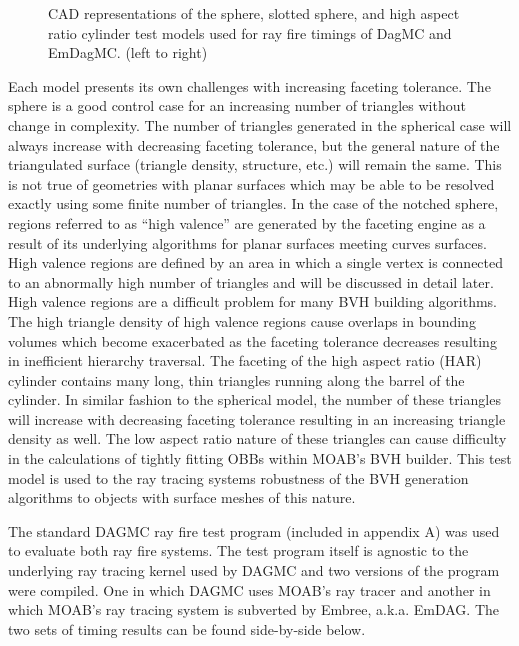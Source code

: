 \documentclass[10pt, a4paper]{article}
\begin{document}
\begin{figure}
\begin{center}
    \caption{CAD representations of the sphere, slotted sphere, and high aspect ratio cylinder test models used for ray fire timings of DagMC and EmDagMC. (left to right) \label{models}}

  \end{center}
\vspace{-0.3cm}

\end{figure} 


Each model presents its own challenges with increasing faceting tolerance. The sphere is a good control case for an increasing number of triangles without change in complexity. The number of triangles generated in the spherical case will always increase with decreasing faceting tolerance, but the general nature of the triangulated surface (triangle density, structure, etc.) will remain the same. This is not true of geometries with planar surfaces which may be able to be resolved exactly using some finite number of triangles. In the case of the notched sphere, regions referred to as ``high valence'' are generated by the faceting engine as a result of its underlying algorithms for planar surfaces meeting curves surfaces. High valence regions are defined by an area in which a single vertex is connected to an abnormally high number of triangles and will be discussed in detail later. High valence regions are a difficult problem for many BVH building algorithms. The high triangle density of high valence regions cause overlaps in bounding volumes which become exacerbated as the faceting tolerance decreases resulting in inefficient hierarchy traversal. The faceting of the high aspect ratio (HAR) cylinder contains many long, thin triangles running along the barrel of the cylinder. In similar fashion to the spherical model, the number of these triangles will increase with decreasing faceting tolerance resulting in an increasing triangle density as well. The low aspect ratio nature of these triangles can cause difficulty in the calculations of tightly fitting OBBs within MOAB's BVH builder. This test model is used to the ray tracing systems robustness of the BVH generation algorithms to objects with surface meshes of this nature.

The standard DAGMC ray fire test program (included in appendix A) was used to evaluate both ray fire systems. The test program itself is agnostic to the underlying ray tracing kernel used by DAGMC and two versions of the program were compiled. One in which DAGMC uses MOAB's ray tracer and another in which MOAB's ray tracing system is subverted by Embree, a.k.a. EmDAG. The two sets of timing results can be found side-by-side below.
\end{document}
